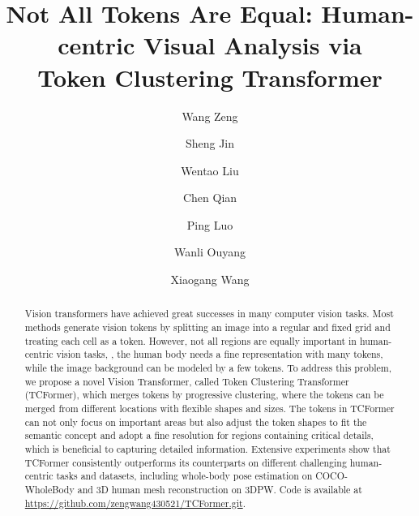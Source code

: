 \documentclass[10pt,twocolumn,letterpaper]{article}
\begin{document}
\title{Not All Tokens Are Equal: Human-centric Visual Analysis via \\Token Clustering  Transformer}


\makeatletter
\renewcommand\AB@affilsepx{ \protect\Affilfont}
\makeatother

\author[1]{Wang Zeng}
\author[2,3]{Sheng Jin}
\author[3]{Wentao Liu}
\author[3]{Chen Qian}
\author[2]{Ping Luo}
\author[4]{Wanli Ouyang}
\author[1]{Xiaogang Wang}





\maketitle

\begin{abstract}
Vision transformers have achieved great successes in many computer vision tasks. Most methods generate vision tokens by splitting an image into a regular and fixed grid and treating each cell as a token. However, not all regions are equally important in human-centric vision tasks, \eg, the human body needs a fine representation with many tokens, while the image background can be modeled by a few tokens. 
To address this problem, we propose a novel  Vision Transformer, called Token Clustering Transformer (TCFormer), which merges tokens by progressive clustering, where the tokens can be merged from different locations with flexible shapes and sizes. The tokens in TCFormer can not only focus on important areas but also adjust the token shapes to fit the semantic concept and adopt a fine resolution for regions containing critical details, which is beneficial to capturing detailed information.
Extensive experiments show that TCFormer consistently outperforms its counterparts on different challenging human-centric tasks and datasets, including whole-body pose estimation on COCO-WholeBody and 3D human mesh reconstruction on 3DPW. 
Code is available at \url{https://github.com/zengwang430521/TCFormer.git}.

\end{abstract}
\end{document}
